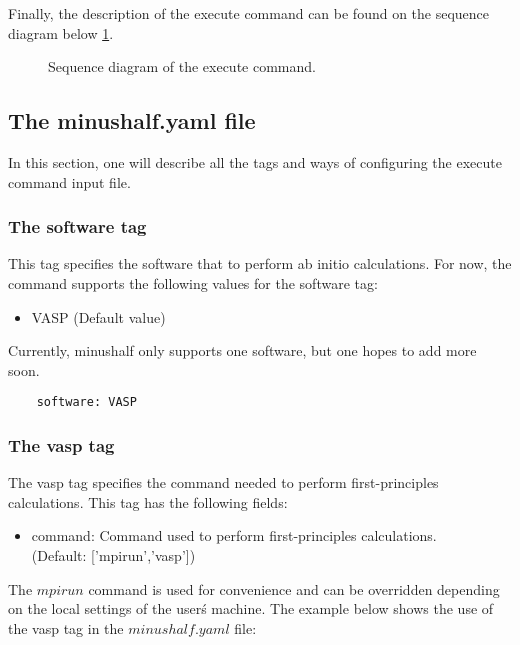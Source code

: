 Finally, the description of the execute command can be  found on the sequence diagram below \ref{fig::execute_seq}.
\begin{figure}[!ht]
        \centering
        
        \caption{Sequence diagram of the execute command.}
        \label{fig::execute_seq}
\end{figure}

\subsection{The minushalf.yaml file}
\label{minushalf-input}
In this section, one will describe all the tags and ways of configuring the execute command input file.

\subsubsection{The software tag}
This tag specifies the software that to perform ab initio calculations. For now, the command supports the following values for the software tag:
\begin{itemize}
    \item VASP (Default value)
\end{itemize}
Currently, minushalf only supports one software, but one hopes to add more soon.

\begin{verbatim}
    software: VASP
  \end{verbatim}
 
\subsubsection{The vasp tag}
The vasp tag specifies the command needed to perform first-principles calculations. This tag has the following fields:

\begin{itemize}
    \item command: Command used to perform first-principles calculations.\\ (Default: ['mpirun','vasp'])
\end{itemize}

The $mpirun$ command is used for convenience and can be overridden depending on the local settings of the user\'s machine. The example below  shows the use of the vasp tag in the $minushalf.yaml$ file:

